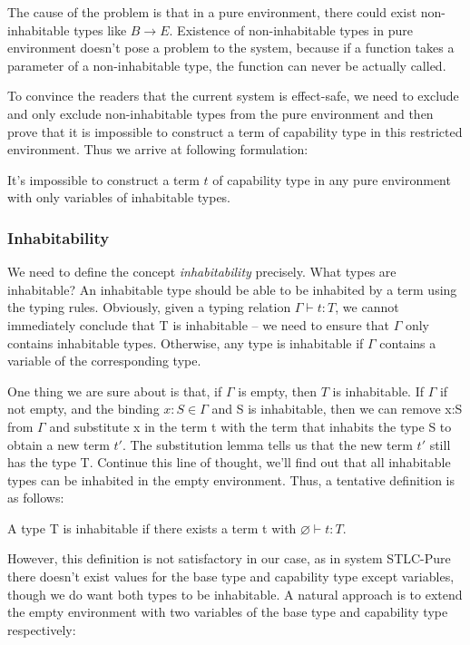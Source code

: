 The cause of the problem is that in a pure environment, there could
exist non-inhabitable types like $B \to E$.  Existence of
non-inhabitable types in pure environment doesn't pose a problem to
the system, because if a function takes a parameter of a
non-inhabitable type, the function can never be actually called.

To convince the readers that the current system is effect-safe, we
need to exclude and only exclude non-inhabitable types from the pure
environment and then prove that it is impossible to construct a term
of capability type in this restricted environment. Thus we arrive at
following formulation:

\begin{definition}
  It's impossible to construct a term $t$ of capability type in any
  pure environment with only variables of inhabitable types.
\end{definition}

\subsubsection{Inhabitability}

We need to define the concept \emph{inhabitability} precisely. What
types are inhabitable? An inhabitable type should be able to be
inhabited by a term using the typing rules. Obviously, given a typing
relation $\Gamma \vdash t: T$, we cannot immediately conclude that T
is inhabitable -- we need to ensure that $\Gamma$ only contains
inhabitable types. Otherwise, any type is inhabitable if $\Gamma$
contains a variable of the corresponding type.

One thing we are sure about is that, if $\Gamma$ is empty, then $T$ is
inhabitable. If $\Gamma$ if not empty, and the binding
$x:S \in \Gamma$ and S is inhabitable, then we can remove x:S from
$\Gamma$ and substitute x in the term t with the term that inhabits
the type S to obtain a new term $t'$. The substitution lemma tells us
that the new term $t'$ still has the type T. Continue this line of
thought, we'll find out that all inhabitable types can be inhabited in
the empty environment. Thus, a tentative definition is as follows:

\begin{definition}
  A type T is inhabitable if there exists a term t with $\varnothing
  \vdash t : T$.
\end{definition}

However, this definition is not satisfactory in our case, as in system
STLC-Pure there doesn't exist values for the base type and capability
type except variables, though we do want both types to be
inhabitable. A natural approach is to extend the empty environment
with two variables of the base type and capability type respectively:

